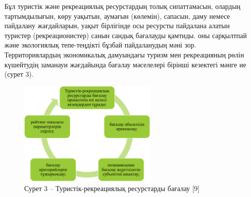 \begin{multicols}{2}
Бұл туристік және рекреациялық ресурстардың толық сипаттамасын, олардың
тартымдылығын, көру уақытын, аумағын (көлемін), сапасын, даму немесе
пайдалану жағдайларын, уақыт бірлігінде осы ресурсты пайдалана алатын
туристер (рекреационистер) санын сандық бағалауды қамтиды. оны
сарқылтпай және экологиялық тепе-теңдікті бұзбай пайдаланудың мәні зор.
Территориялардың экономикалық дамуындағы туризм мен рекреацияның рөлін
күшейтудің заманауи жағдайында бағалау мәселелері бірінші кезектегі
мәнге ие (сурет 3).
\end{multicols}

\begin{figure}[H]
	\centering
	\includegraphics[width=0.6\textwidth]{assets/1113}
	\caption*{Сурет 3 -- Туристік-рекреациялық ресурстарды бағалау {[}9{]}}
\end{figure}

